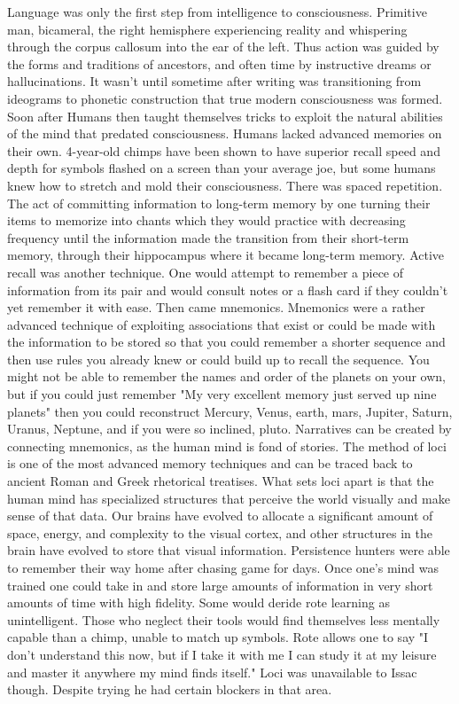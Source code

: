Language was only the first step from intelligence to consciousness. Primitive man, bicameral, the right hemisphere experiencing reality and whispering through the corpus callosum into the ear of the left. Thus action was guided by the forms and traditions of ancestors, and often time by instructive dreams or hallucinations. It wasn't until sometime after writing was transitioning from ideograms to phonetic construction that true modern consciousness was formed. Soon after Humans then taught themselves tricks to exploit the natural abilities of the mind that predated consciousness. Humans lacked advanced memories on their own. 4\hyp{}year\hyp{}old chimps have been shown to have superior recall speed and depth for symbols flashed on a screen than your average joe, but some humans knew how to stretch and mold their consciousness. There was spaced repetition. The act of committing information to long\hyp{}term memory by one turning their items to memorize into chants which they would practice with decreasing frequency until the information made the transition from their short\hyp{}term memory, through their hippocampus where it became long\hyp{}term memory. Active recall was another technique. One would attempt to remember a piece of information from its pair and would consult notes or a flash card if they couldn't yet remember it with ease. Then came mnemonics. Mnemonics were a rather advanced technique of exploiting associations that exist or could be made with the information to be stored so that you could remember a shorter sequence and then use rules you already knew or could build up to recall the sequence. You might not be able to remember the names and order of the planets on your own, but if you could just remember "My very excellent memory just served up nine planets" then you could reconstruct Mercury, Venus, earth, mars, Jupiter, Saturn, Uranus, Neptune, and if you were so inclined, pluto. Narratives can be created by connecting mnemonics, as the human mind is fond of stories. The method of loci is one of the most advanced memory techniques and can be traced back to ancient Roman and Greek rhetorical treatises. What sets loci apart is that the human mind has specialized structures that perceive the world visually and make sense of that data. Our brains have evolved to allocate a significant amount of space, energy, and complexity to the visual cortex, and other structures in the brain have evolved to store that visual information. Persistence hunters were able to remember their way home after chasing game for days. Once one's mind was trained one could take in and store large amounts of information in very short amounts of time with high fidelity. Some would deride rote learning as unintelligent. Those who neglect their tools would find themselves less mentally capable than a chimp, unable to match up symbols. Rote allows one to say "I don't understand this now, but if I take it with me I can study it at my leisure and master it anywhere my mind finds itself." Loci was unavailable to Issac though. Despite trying he had certain blockers in that area.

